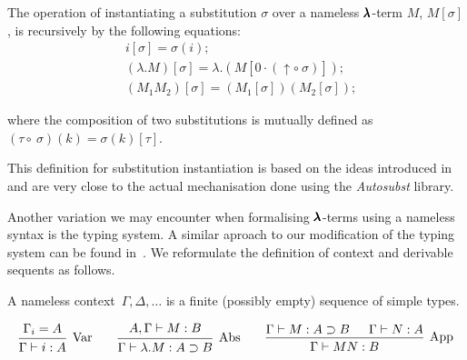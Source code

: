 \begin{definition}
  The operation of instantiating a substitution $\sigma$ over a nameless $\pmb{\lambda}$-term $M$, $M[\sigma]$, is recursively by the following equations:
  \begin{align*}
    & i[\sigma] = \sigma(i); \\
    & (\lambda . M)[\sigma] = \lambda . (M[0 \cdot (\uparrow \circ \ \sigma)]); \\
    & (M_1 M_2)[\sigma] = (M_1[\sigma]) (M_2[\sigma]);
  \end{align*}

  where the composition of two substitutions is mutually defined as $(\tau \circ \ \sigma)(k) = \sigma(k)[\tau]$.
\end{definition}

This definition for substitution instantiation is based on the ideas introduced in~\cite{AutosubstSchafer} and are very close to the actual mechanisation done using the \textit{Autosubst} library.  

Another variation we may encounter when formalising $\pmb{\lambda}$-terms using a nameless syntax is the typing system.
A similar aproach to our modification of the typing system can be found in~\cite[Chapter~7]{AndrewAdams}.
We reformulate the definition of context and derivable sequents as follows.

\begin{definition}
  A nameless context~$\Gamma, \Delta, \dots$ is a finite (possibly empty) sequence of simple types.
\end{definition}

\begin{definition}
  \label{nameless_typing_rules}
  \[
    \begin{prooftree}
      \hypo{ \Gamma_i = A }
      \infer1[Var]{ \Gamma \vdash i:A } 
    \end{prooftree}
    \qquad
    \begin{prooftree}
      \hypo{ A, \Gamma \vdash M:B }
      \infer1[Abs]{ \Gamma \vdash \lambda . M : A \supset B  } 
    \end{prooftree}
    \qquad
    \begin{prooftree}
      \hypo{ \Gamma \vdash M : A \supset B }
      \hypo{ \Gamma \vdash N : A }	
      \infer2[App]{ \Gamma \vdash M N : B } 
    \end{prooftree}
  \]
\end{definition}

